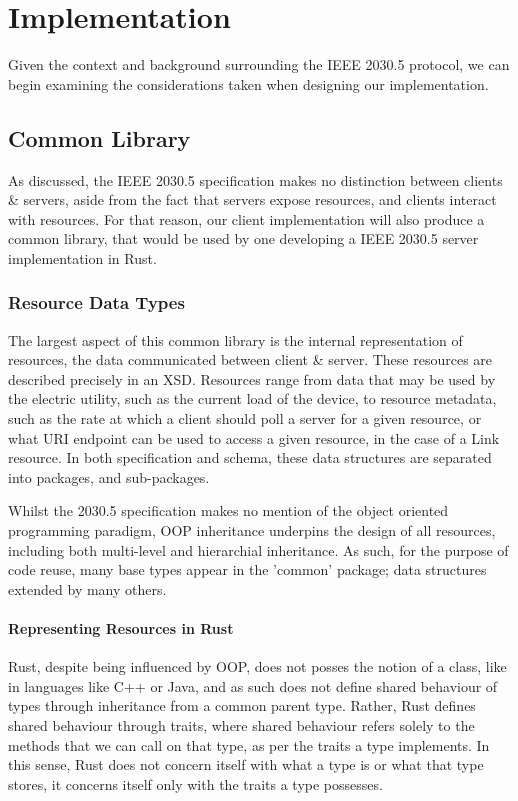 \chapter{Implementation}\label{ch:implementation}
Given the context and background surrounding the IEEE 2030.5 protocol, we can begin examining the considerations taken when designing our implementation.

\section{Common Library}
As discussed, the IEEE 2030.5 specification makes no distinction between clients \& servers, aside from the fact that servers expose resources, and clients interact with resources. 
For that reason, our client implementation will also produce a common library, that would be used by one developing a IEEE 2030.5 server implementation in Rust.

\subsection{Resource Data Types}
The largest aspect of this common library is the internal representation of resources, the data communicated between client \& server. These resources are described precisely in an XSD.
Resources range from data that may be used by the electric utility, such as the current load of the device, to resource metadata, such as the rate at which a client should poll a server for a given resource, or what URI endpoint can be used to access a given resource, in the case of a Link resource.
In both specification and schema, these data structures are separated into packages, and sub-packages. 

Whilst the 2030.5 specification makes no mention of the object oriented programming paradigm, OOP inheritance underpins the design of all resources, including both multi-level and hierarchial inheritance.
As such, for the purpose of code reuse, many base types appear in the 'common' package; data structures extended by many others.

\subsubsection{Representing Resources in Rust}
Rust, despite being influenced by OOP, does not posses the notion of a class, like in languages like C++ or Java, and as such does not define shared behaviour of types through inheritance from a common parent type. 
Rather, Rust defines shared behaviour through traits, where shared behaviour refers solely to the methods that we can call on that type, as per the traits a type implements.
In this sense, Rust does not concern itself with what a type is or what that type stores, it concerns itself only with the traits a type possesses.

